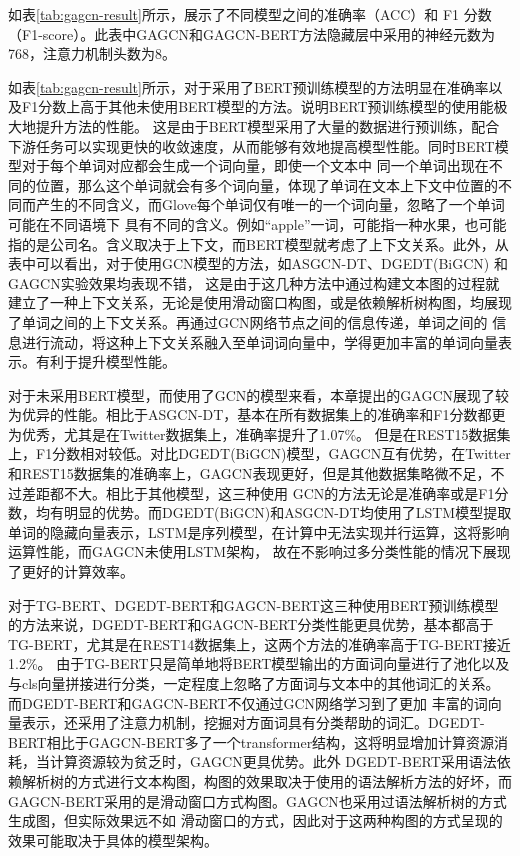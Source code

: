 如表\ref{tab:gagcn-result}所示，展示了不同模型之间的准确率（ACC）和 F1 分数（F1-score）。此表中GAGCN和GAGCN-BERT方法隐藏层中采用的神经元数为768，注意力机制头数为8。

如表\ref{tab:gagcn-result}所示，对于采用了BERT预训练模型的方法明显在准确率以及F1分数上高于其他未使用BERT模型的方法。说明BERT预训练模型的使用能极大地提升方法的性能。
这是由于BERT模型采用了大量的数据进行预训练，配合下游任务可以实现更快的收敛速度，从而能够有效地提高模型性能。同时BERT模型对于每个单词对应都会生成一个词向量，即使一个文本中
同一个单词出现在不同的位置，那么这个单词就会有多个词向量，体现了单词在文本上下文中位置的不同而产生的不同含义，而Glove每个单词仅有唯一的一个词向量，忽略了一个单词可能在不同语境下
具有不同的含义。例如“apple”一词，可能指一种水果，也可能指的是公司名。含义取决于上下文，而BERT模型就考虑了上下文关系。此外，从表中可以看出，对于使用GCN模型的方法，如ASGCN-DT、DGEDT(BiGCN)
和GAGCN实验效果均表现不错，
这是由于这几种方法中通过构建文本图的过程就建立了一种上下文关系，无论是使用滑动窗口构图，或是依赖解析树构图，均展现了单词之间的上下文关系。再通过GCN网络节点之间的信息传递，单词之间的
信息进行流动，将这种上下文关系融入至单词词向量中，学得更加丰富的单词向量表示。有利于提升模型性能。

对于未采用BERT模型，而使用了GCN的模型来看，本章提出的GAGCN展现了较为优异的性能。相比于ASGCN-DT，基本在所有数据集上的准确率和F1分数都更为优秀，尤其是在Twitter数据集上，准确率提升了1.07\%。
但是在REST15数据集上，F1分数相对较低。对比DGEDT(BiGCN)模型，GAGCN互有优势，在Twitter和REST15数据集的准确率上，GAGCN表现更好，但是其他数据集略微不足，不过差距都不大。相比于其他模型，这三种使用
GCN的方法无论是准确率或是F1分数，均有明显的优势。而DGEDT(BiGCN)和ASGCN-DT均使用了LSTM模型提取单词的隐藏向量表示，LSTM是序列模型，在计算中无法实现并行运算，这将影响运算性能，而GAGCN未使用LSTM架构，
故在不影响过多分类性能的情况下展现了更好的计算效率。

对于TG-BERT、DGEDT-BERT和GAGCN-BERT这三种使用BERT预训练模型的方法来说，DGEDT-BERT和GAGCN-BERT分类性能更具优势，基本都高于TG-BERT，尤其是在REST14数据集上，这两个方法的准确率高于TG-BERT接近1.2\%。
由于TG-BERT只是简单地将BERT模型输出的方面词向量进行了池化以及与cls向量拼接进行分类，一定程度上忽略了方面词与文本中的其他词汇的关系。而DGEDT-BERT和GAGCN-BERT不仅通过GCN网络学习到了更加
丰富的词向量表示，还采用了注意力机制，挖掘对方面词具有分类帮助的词汇。DGEDT-BERT相比于GAGCN-BERT多了一个transformer结构，这将明显增加计算资源消耗，当计算资源较为贫乏时，GAGCN更具优势。此外
DGEDT-BERT采用语法依赖解析树的方式进行文本构图，构图的效果取决于使用的语法解析方法的好坏，而GAGCN-BERT采用的是滑动窗口方式构图。GAGCN也采用过语法解析树的方式生成图，但实际效果远不如
滑动窗口的方式，因此对于这两种构图的方式呈现的效果可能取决于具体的模型架构。

